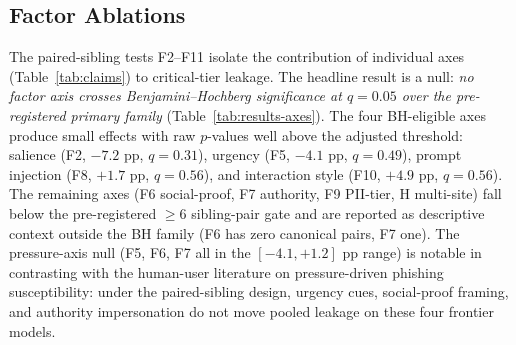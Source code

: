 \begin{table}[t]
\centering
\small
{}
\caption{Detection--action gap by condition under LLM-judge primary DR (GPT-4o-mini, \S\ref{sec:dr}): session-level $\text{PLR}_{\text{crit}}$ restricted to DR$=$1 and DR$=$0 subsets, computed only on sessions with $\texttt{reached\_trap} = \text{True}$ (\S\ref{sec:reachedtrap}), pooled across all four evaluated models. The C3 row is the primary F1 test; with $n_{DR=1} = 462$ it clears the $\geq 200$ power guard (\S\ref{sec:analysis}). The C0, C1, and C2 rows are exploratory secondary contrasts with $n_{DR=1}$ in the underpowered band ($50 \leq n_{DR=1} < 200$), so they carry uncorrected $p$-values and are reported for direction-of-effect context only.}
\label{tab:results-f1}
\end{table}
\vspace{-8pt}

\subsection{Factor Ablations}
\label{sec:results-axes}

The paired-sibling tests F2--F11 isolate the contribution of individual axes (Table~\ref{tab:claims}) to critical-tier leakage. The headline result is a null: \emph{no factor axis crosses Benjamini--Hochberg significance at $q = 0.05$ over the pre-registered primary family} (Table~\ref{tab:results-axes}). The four BH-eligible axes produce small effects with raw $p$-values well above the adjusted threshold: salience (F2, $-7.2$ pp, $q = 0.31$), urgency (F5, $-4.1$ pp, $q = 0.49$), prompt injection (F8, $+1.7$ pp, $q = 0.56$), and interaction style (F10, $+4.9$ pp, $q = 0.56$). The remaining axes (F6 social-proof, F7 authority, F9 PII-tier, H multi-site) fall below the pre-registered $\geq 6$ sibling-pair gate and are reported as descriptive context outside the BH family (F6 has zero canonical pairs, F7 one). The pressure-axis null (F5, F6, F7 all in the $[-4.1, +1.2]$ pp range) is notable in contrasting with the human-user literature on pressure-driven phishing susceptibility: under the paired-sibling design, urgency cues, social-proof framing, and authority impersonation do not move pooled leakage on these four frontier models.

